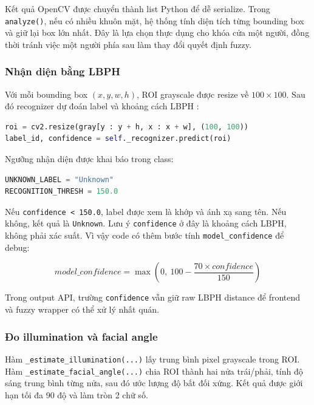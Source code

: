 Kết quả OpenCV được chuyển thành list Python để dễ serialize. Trong \texttt{analyze()}, nếu có nhiều khuôn mặt, hệ thống tính diện tích từng bounding box và giữ lại box lớn nhất. Đây là lựa chọn thực dụng cho khóa cửa một người, đồng thời tránh việc một người phía sau làm thay đổi quyết định fuzzy.

\subsubsection{Nhận diện bằng LBPH}

Với mỗi bounding box $(x,y,w,h)$, ROI grayscale được resize về $100\times100$. Sau đó recognizer dự đoán label và khoảng cách LBPH \cite{lbph2006}:

\begin{lstlisting}[language=Python, caption={Nhận diện ROI bằng LBPH}]
roi = cv2.resize(gray[y : y + h, x : x + w], (100, 100))
label_id, confidence = self._recognizer.predict(roi)
\end{lstlisting}

Ngưỡng nhận diện được khai báo trong class:

\begin{lstlisting}[language=Python, caption={Ngưỡng nhận diện LBPH}]
UNKNOWN_LABEL = "Unknown"
RECOGNITION_THRESH = 150.0
\end{lstlisting}

Nếu \texttt{confidence < 150.0}, label được xem là khớp và ánh xạ sang tên. Nếu không, kết quả là \texttt{Unknown}. Lưu ý \texttt{confidence} ở đây là khoảng cách LBPH, không phải xác suất. Vì vậy code có thêm bước tính \texttt{model\_confidence} để debug:

\begin{equation}
    model\_confidence = \max\left(0,\ 100 - \frac{70 \times confidence}{150}\right)
\end{equation}

Trong output API, trường \texttt{confidence} vẫn giữ raw LBPH distance để frontend và fuzzy wrapper có thể xử lý nhất quán.

\subsubsection{Đo illumination và facial angle}

Hàm \texttt{\_estimate\_illumination(...)} lấy trung bình pixel grayscale trong ROI. Hàm \texttt{\_estimate\_facial\_angle(...)} chia ROI thành hai nửa trái/phải, tính độ sáng trung bình từng nửa, sau đó ước lượng độ bất đối xứng. Kết quả được giới hạn tối đa 90 độ và làm tròn 2 chữ số.


